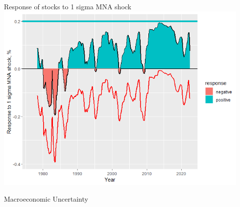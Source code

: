 \documentclass{beamer}
\begin{document}
\normalsize
\begin{frame}{Response of stocks to 1 sigma MNA shock}
\centering
\includegraphics[width=0.94\textwidth]{images/1980s_plot2.png}
\end{frame}



\begin{frame}{Macroeconomic Uncertainty}
\centering
\vspace{-0.1cm}
\end{frame}
\end{document}
